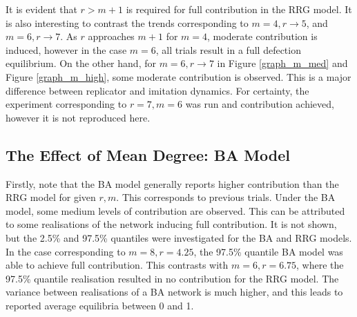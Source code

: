  \FloatBarrier

It is evident that $r>m+1$ is required for full contribution in the RRG model. It is also interesting  to contrast the trends corresponding to $m=4, r \to 5$, and $m=6, r \to 7$. As $r$ approaches $m+1$ for $m=4$, moderate contribution is induced, however in the case $m=6$, all trials result in a full defection equilibrium. On the other hand, for $m = 6, r \to 7$ in Figure \ref{graph_m_med} and Figure \ref{graph_m_high}, some moderate contribution is observed. This is a major difference between replicator and imitation dynamics. For certainty, the experiment corresponding to $r=7, m =6$ was run and contribution achieved, however it is not reproduced here. 



\subsection{The Effect of Mean Degree: BA Model}
\FloatBarrier
{}
\FloatBarrier
{}
\FloatBarrier

\FloatBarrier

Firstly, note that the BA model generally reports higher contribution than the RRG model for given $r,m$. This corresponds to previous trials. Under the BA model, some medium levels of contribution are observed. This can be attributed to some realisations of the network inducing full contribution. It is not shown, but the 2.5\% and 97.5\% quantiles were investigated for the BA and RRG models. In the case corresponding to $m=8, r = 4.25$, the 97.5\% quantile BA model was able to achieve full contribution. This contrasts with $m=6, r = 6.75$, where the 97.5\% quantile realisation resulted in no contribution for the RRG model. The variance between realisations of a BA network is much higher, and this leads to reported average equilibria between 0 and 1. 

